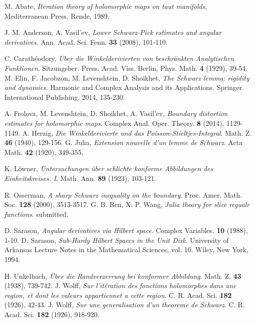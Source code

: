 \documentclass{amsart}
\theoremstyle{definition}
\theoremstyle{remark}
\numberwithin{equation}{section}
\begin{document}

\begin{thebibliography}{99}

 M. Abate, \textit{Iteration theory of holomorphic maps on taut manifolds}, Mediterranean Press, Rende, 1989.

 J. M. Anderson, A. Vasil'ev, \textit{Lower Schwarz-Pick estimates and angular derivatives}. Ann. Acad. Sci. Fenn. \textbf{33} (2008), 101-110.


 C. Carath\'{e}odory, \textit{Uber die Winkelderivierten von beschr\"{a}nkten Analytischen Funktionen}. Sitzungsber. Press. Acad. Viss. Berlin, Phys. Math. \textbf{4} (1929), 39-54.
 M. Elin, F. Jacobzon, M. Levenshtein, D. Shoikhet, \textit{The Schwarz lemma: rigidity and dynamics.} Harmonic and Complex Analysis and its Applications. Springer International Publishing, 2014, 135-230.

 A. Frolova, M. Levenshtein, D. Shoikhet, A. Vasil'ev, \textit{Boundary distortion estimates for holomorphic maps}. Complex Anal. Oper. Theory. \textbf{8} (2014), 1129-1149.
 A. Herzig, \textit{Die Winkelderivierte und das Poisson-Stieltjes-Integral}. Math. Z. \textbf{46} (1940), 129-156.
 G. Julia, \textit{Extension nouvelle d'un lemme de Schwarz}. Acta Math. \textbf{42} (1920), 349-355.

 K. L\"{o}wner, \textit{Untersuchungen \"{u}ber schlichte konforme Abbildungen des Einheitskreises. I}. Math. Ann. \textbf{89} (1923), 103-121.


 R. Osserman, \textit{A sharp Schwarz inequality on the boundary}. Proc. Amer. Math. Soc. \textbf{128} (2000), 3513-3517.
 G. B. Ren, X. P. Wang, \textit{Julia theory for slice regualr functions}. submitted.

 D. Sarason, \textit{Angular derivatives via Hilbert space}. Complex Variables. \textbf{10} (1988), 1-10.
 D. Sarason, \textit{Sub-Hardy Hilbert Spaces in the Unit Disk}. University of Arkansas Lecture Notes in the Mathematical Sciences, vol. 10. Wiley, New York, 1994.

 H. Unkelbach, \textit{\"{U}ber die Randverzerrung bei konformer Abbildung}. Math. Z. \textbf{43} (1938), 739-742.
 J. Wolff, \textit{Sur l'it\'{e}ration des fonctions holomorphes dans une region, et dont les valeurs appartiennet a cette region}. C. R. Acad. Sci. \textbf{182} (1926), 42-43.
 J. Wolff,  \textit{Sur une generalisation d'un theoreme de Schwarz}. C. R. Acad. Sci. \textbf{182} (1926), 918-920.
\end{thebibliography}
\end{document}
